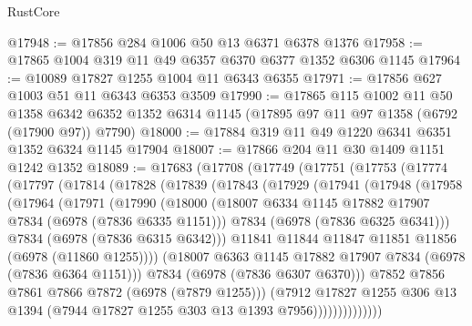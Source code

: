 \begin{lexlean}{RustCore}
\begin{coremodule}
@17948 := @17856 @284 @1006 @50 @13 @6371 @6378 @1376
@17958 := @17865 @1004 @319 @11 @49 @6357 @6370 @6377 @1352 @6306 @1145
@17964 := @10089 @17827 @1255 @1004 @11 @6343 @6355
@17971 := @17856 @627 @1003 @51 @11 @6343 @6353 @3509
@17990 := @17865
    @115
    @1002
    @11
    @50
    @1358
    @6342
    @6352
    @1352
    @6314
    @1145
    (@17895 @97 @11 @97 @1358 (@6792 (@17900 @97)) @7790)
@18000 := @17884 @319 @11 @49 @1220 @6341 @6351 @1352 @6324 @1145 @17904
@18007 := @17866 @204 @11 @30 @1409 @1151 @1242 @1352
@18089 := @17683
    (@17708
      (@17749
        (@17751
          (@17753
            (@17774
              (@17797
                (@17814
                  (@17828
                    (@17839
                      (@17843
                        (@17929
                          (@17941
                            (@17948
                              (@17958
                                (@17964
                                  (@17971
                                    (@17990
                                      (@18000
                                        (@18007
                                          @6334
                                          @1145
                                          @17882
                                          @17907
                                          @7834
                                          (@6978 (@7836 @6335 @1151)))
                                        @7834
                                        (@6978 (@7836 @6325 @6341)))
                                      @7834
                                      (@6978 (@7836 @6315 @6342)))
                                    @11841
                                    @11844
                                    @11847
                                    @11851
                                    @11856
                                    (@6978 (@11860 @1255))))
                                (@18007 @6363 @1145 @17882 @17907 @7834 (@6978 (@7836 @6364 @1151)))
                                @7834
                                (@6978 (@7836 @6307 @6370)))
                              @7852
                              @7856
                              @7861
                              @7866
                              @7872
                              (@6978 (@7879 @1255)))
                            (@7912
                              @17827
                              @1255
                              @306
                              @13
                              @1394
                              (@7944 @17827 @1255 @303 @13 @1393 @7956))))))))))))))

\end{coremodule}
\end{lexlean}
